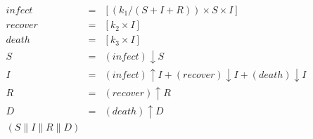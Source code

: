 %
\begin{eqnarray*}
\mathit{infect} & = & [(k_1/(S+I+R))\times S\times I]\\%
\mathit{recover} & = & [k_2\times I]\\%
\mathit{death} & = & [k_3\times I]\\%
%
S & = & (\mathit{infect}){\downarrow}S\\%
I & = & (\mathit{infect}){\uparrow}I + (\mathit{recover}){\downarrow}I + (\mathit{death}){\downarrow}I\\%
R & = & (\mathit{recover}){\uparrow}R\\%
D & = & (\mathit{death}){\uparrow}D\\%
%
(S {\parallel} I {\parallel} R {\parallel} D)\end{eqnarray*}
